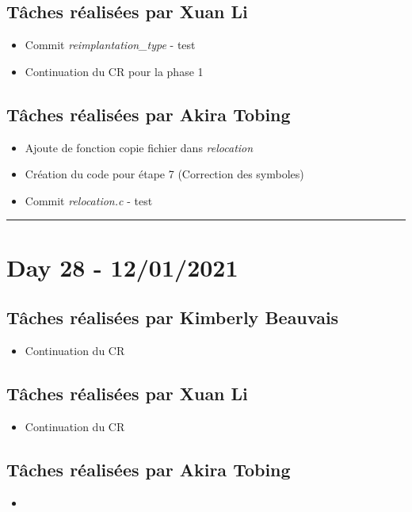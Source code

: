 \documentclass[11pt,letterpaper]{article}
\begin{document}
\subsection*{Tâches réalisées par Xuan Li}
\begin{itemize}
    \item Commit \textit{reimplantation\_type} - test
    \item Continuation du CR pour la phase 1
\end{itemize}

\subsection*{Tâches réalisées par Akira Tobing}
\begin{itemize}
    \item Ajoute de fonction copie fichier dans \textit{relocation} 
    \item Création du code pour étape 7 (Correction des symboles)
    \item Commit \textit{relocation.c} - test
\end{itemize}

\noindent\rule{13cm}{0.4pt}

\section*{Day 28 - 12/01/2021}

\subsection*{Tâches réalisées par Kimberly Beauvais}
\begin{itemize}
    \item Continuation du CR
\end{itemize}

\subsection*{Tâches réalisées par Xuan Li}
\begin{itemize}
    \item Continuation du CR 
\end{itemize}

\subsection*{Tâches réalisées par Akira Tobing}
\begin{itemize}
    \item 
\end{itemize}
\end{document}

